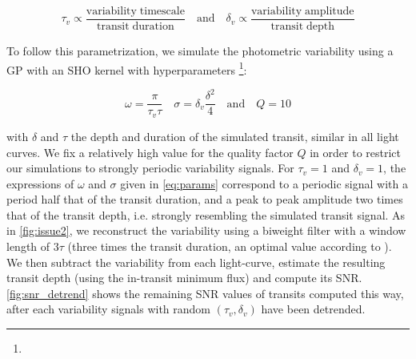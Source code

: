 \documentclass{aastex631}
\begin{document}
\begin{equation}
    \tau_v \propto \frac{\mathrm{variability\; timescale}}{\mathrm{transit\;duration}} \quad \text{and} \quad 
    \delta_v \propto \frac{\mathrm{variability\; amplitude}}{\mathrm{transit\;depth}} 
\end{equation}

To follow this parametrization, we simulate the photometric variability using a GP with an SHO kernel with hyperparameters \footnote{}:

\begin{equation}\label{eq:params}
    \omega = \frac{\pi}{\tau_v\tau} \quad 
    \sigma = \delta_v \frac{\delta^2}{4} \quad  \text{and}  \quad  
    Q = 10
\end{equation}

with $\delta$ and $\tau$ the depth and duration of the simulated transit, similar in all light curves. We fix a relatively high value for the quality factor $Q$ in order to restrict our simulations to strongly periodic variability signals. For $\tau_v=1$ and $\delta_v=1$, the expressions of $\omega$ and $\sigma$ given in \autoref{eq:params} correspond to a periodic signal with a period half that of the transit duration, and a peak to peak amplitude two times that of the transit depth, i.e. strongly resembling the simulated transit signal. As in \autoref{fig:issue2}, we reconstruct the variability using a biweight filter with a window length of $3\tau$ (three times the transit duration, an optimal value according to \citealt{wotan}). We then subtract the variability from each light-curve, estimate the resulting transit depth (using the in-transit minimum flux) and compute its SNR. \autoref{fig:snr_detrend} shows the remaining SNR values of transits computed this way, after each variability signals with random $(\tau_v, \delta_v)$ have been detrended.
\bigskip\\
\end{document}
